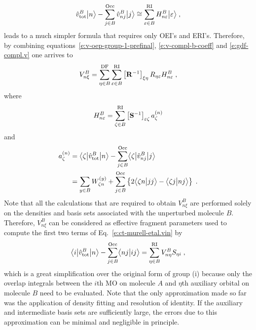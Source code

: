 %
\begin{equation}
 \hat{v}^B_{\rm tot} \Ket{n} - \sum_{j\in B}^{\rm Occ} \hat{v}^B_{nj} \Ket{j}
 \cong \sum_{\varepsilon\in B}^{\rm RI} H_{n\varepsilon}^B \Ket{\varepsilon} \;,
\end{equation}
%
leads to a much simpler formula
that requires only OEI's and ERI's.
Therefore, by combining
equations~\eqref{e:v-oep-group-1-prefinal}, \eqref{e:v-compl-b-coeff} and \eqref{e:gdf-compl.v}
one arrives to
%
\begin{equation} \label{e:v-oep-group-1-final}
 V^B_{n\xi} = \sum_{\eta\in B}^{\rm DF} 
          \sum_{\varepsilon\in B}^{\rm RI}
         \left[ {\bf R}^{-1} \right]_{\xi\eta}
         R_{\eta \varepsilon} 
         H_{n\varepsilon}^B \;,
\end{equation}
%
where
%
\begin{equation} \label{e:v-oep-group-1-final:H-matrix}
 H_{n\varepsilon}^B = \sum_{\zeta\in B}^{\rm RI} \left[ {\bf S}^{-1} \right]_{\varepsilon\zeta}
   a_\zeta^{(n)}
\end{equation}
%
and
\begin{align} \label{e:v-oep-group-1-final:a-vector}
 a^{(n)}_\zeta &= \tBraKet{\zeta}{\hat{v}^B_{\rm tot}}{n}
      - \sum_{j\in B}^{\rm Occ} \tBraKet{\zeta}{\hat{v}^B_{nj}}{j} \nonumber \\
 &= \sum_{y\in B} W^{(y)}_{\zeta n} 
  + \sum_{j\in B}^{\rm Occ} 
  \left\{
   2\BraKet{\zeta n}{jj} - \BraKet{\zeta j}{nj} 
  \right\} \;.
\end{align}
%
Note that all the calculations that are required to obtain $V^B_{n\xi}$ are performed
solely on the densities and basis sets associated with the unperturbed molecule $B$.
Therefore, $V^B_{n\xi}$ can be considered as effective fragment parameters
used to compute the first two terms of Eq.~\eqref{e:ct-murell-etal.vin} by
%
\begin{equation} \label{e:ct.group-i.final}
        \tBraKet{i}{\hat{v}^B_{\rm tot} }{n} 
      - \sum_{j\in B}^{\rm Occ} \BraKet{nj}{ij} 
       = \sum_{\eta\in B}^{\rm RI} V^B_{n\eta} S_{\eta i} \;,
\end{equation}
%
which is a great simplification over the original form of group (i)
because only the overlap integrals between the $i$th MO on molecule $A$
and $\eta$th auxiliary orbital on molecule $B$ need to be evaluated. %
Note that the only approximation made so far was the application of density fitting
and resolution of identity. If the auxiliary and intermediate
basis sets are sufficiently large, the errors
due to this approximation can be minimal and negligible in principle.



